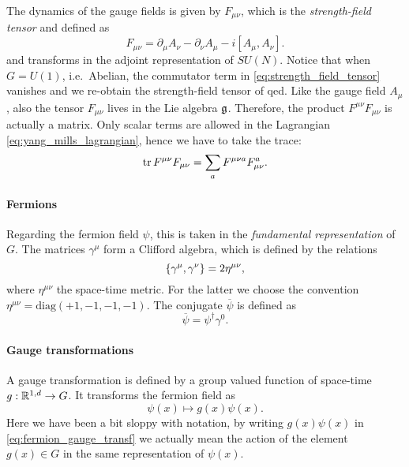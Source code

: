 The dynamics of the gauge fields is given by $F_{\mu \nu}$, which is the \emph{strength-field tensor} and defined as
\begin{equation}
    F_{\mu \nu} = \partial_{\mu} A_{\nu} - \partial_{\nu} A_{\mu} - i [A_{\mu}, A_{\nu}].
    \label{eq:strength_field_tensor}
\end{equation}
and transforms in the adjoint representation of $SU(N)$.
Notice that when $G = U(1)$, i.e.~Abelian, the commutator term in \eqref{eq:strength_field_tensor} vanishes and we re-obtain the strength-field tensor of \ac{qed}.
Like the gauge field $A_{\mu}$, also the tensor $F_{\mu \nu}$ lives in the Lie algebra $\mathfrak{g}$.
Therefore, the product $F^{\mu \nu} F_{\mu \nu}$ is actually a matrix.
Only scalar terms are allowed in the Lagrangian \eqref{eq:yang_mills_lagrangian}, hence we have to take the trace:
\begin{equation*}
    \tr F^{\mu \nu} F_{\mu \nu} = \sum_{a} F^{\mu \nu a} F_{\mu \nu}^a.
\end{equation*}

\paragraph*{Fermions}

Regarding the fermion field $\psi$, this is taken in the \emph{fundamental representation} of $G$.
The matrices $\gamma^{\mu}$ form a Clifford algebra, which is defined by the relations
\begin{equation}
    \acomm{\gamma^{\mu}}{\gamma^{\nu}} = 2 \eta^{\mu \nu},
\end{equation}
where $\eta^{\mu \nu}$ the space-time metric.
For the latter we choose the convention $\eta^{\mu \nu} = \mathrm{diag}(+1, -1, -1, -1)$.
The conjugate $\overline{\psi}$ is defined as
\begin{equation*}
    \overline{\psi} = \psi^{\dagger}\gamma^0.
\end{equation*}


\paragraph*{Gauge transformations}

A gauge transformation is defined by a group valued function of space-time $g: \mathbb{R}^{1,d} \to G$.
It transforms the fermion field as
\begin{equation}
    \psi(x) \mapsto g(x) \psi(x).
    \label{eq:fermion_gauge_transf}
\end{equation}
Here we have been a bit sloppy with notation, by writing $g(x) \psi(x)$ in \eqref{eq:fermion_gauge_transf} we actually mean the action of the element $g(x) \in G$ in the same representation of $\psi(x)$.

